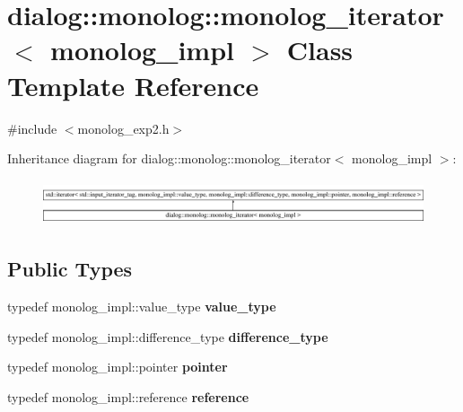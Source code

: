 \hypertarget{classdialog_1_1monolog_1_1monolog__iterator}{}\section{dialog\+:\+:monolog\+:\+:monolog\+\_\+iterator$<$ monolog\+\_\+impl $>$ Class Template Reference}
\label{classdialog_1_1monolog_1_1monolog__iterator}


{\ttfamily \#include $<$monolog\+\_\+exp2.\+h$>$}

Inheritance diagram for dialog\+:\+:monolog\+:\+:monolog\+\_\+iterator$<$ monolog\+\_\+impl $>$\+:\begin{figure}[H]
\begin{center}
\leavevmode
\includegraphics[height=1.339713cm]{classdialog_1_1monolog_1_1monolog__iterator}
\end{center}
\end{figure}
\subsection*{Public Types}
\begin{DoxyCompactItemize}
\item 
\mbox{\label{classdialog_1_1monolog_1_1monolog__iterator_a2e80ff238954336c044562b8636ce2c0}} 
typedef monolog\+\_\+impl\+::value\+\_\+type {\bfseries value\+\_\+type}
\item 
\mbox{\label{classdialog_1_1monolog_1_1monolog__iterator_a3213d75c72b443179bb606dca240fff1}} 
typedef monolog\+\_\+impl\+::difference\+\_\+type {\bfseries difference\+\_\+type}
\item 
\mbox{\label{classdialog_1_1monolog_1_1monolog__iterator_af8237350c8b12bd085a5cc73a5aed7f1}} 
typedef monolog\+\_\+impl\+::pointer {\bfseries pointer}
\item 
\mbox{\label{classdialog_1_1monolog_1_1monolog__iterator_ade69ab3ba194147b27dc0b8fe322fdbb}} 
typedef monolog\+\_\+impl\+::reference {\bfseries reference}
\end{DoxyCompactItemize}
